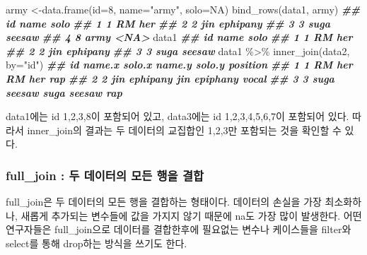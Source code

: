 \documentclass[
]{book}
\newenvironment{Shaded}{\begin{snugshade}}{\end{snugshade}}
\newcommand{\AttributeTok}[1]{\textcolor[rgb]{0.77,0.63,0.00}{#1}}
\newcommand{\ConstantTok}[1]{\textcolor[rgb]{0.00,0.00,0.00}{#1}}
\newcommand{\DecValTok}[1]{\textcolor[rgb]{0.00,0.00,0.81}{#1}}
\newcommand{\DocumentationTok}[1]{\textcolor[rgb]{0.56,0.35,0.01}{\textbf{\textit{#1}}}}
\newcommand{\FunctionTok}[1]{\textcolor[rgb]{0.00,0.00,0.00}{#1}}
\newcommand{\NormalTok}[1]{#1}
\newcommand{\OtherTok}[1]{\textcolor[rgb]{0.56,0.35,0.01}{#1}}
\newcommand{\SpecialCharTok}[1]{\textcolor[rgb]{0.00,0.00,0.00}{#1}}
\newcommand{\StringTok}[1]{\textcolor[rgb]{0.31,0.60,0.02}{#1}}
\theoremstyle{definition}
\theoremstyle{definition}
\theoremstyle{definition}
\theoremstyle{definition}
\theoremstyle{remark}
\begin{document}
\begin{Shaded}
\begin{Highlighting}[]
\NormalTok{army }\OtherTok{\textless{}{-}}\FunctionTok{data.frame}\NormalTok{(}\AttributeTok{id=}\DecValTok{8}\NormalTok{, }\AttributeTok{name=}\StringTok{"army"}\NormalTok{, }\AttributeTok{solo=}\ConstantTok{NA}\NormalTok{)}
\FunctionTok{bind\_rows}\NormalTok{(data1, army)}
\DocumentationTok{\#\#   id name     solo}
\DocumentationTok{\#\# 1  1   RM      her}
\DocumentationTok{\#\# 2  2  jin ephipany}
\DocumentationTok{\#\# 3  3 suga   seesaw}
\DocumentationTok{\#\# 4  8 army     \textless{}NA\textgreater{}}
\NormalTok{data1}
\DocumentationTok{\#\#   id name     solo}
\DocumentationTok{\#\# 1  1   RM      her}
\DocumentationTok{\#\# 2  2  jin ephipany}
\DocumentationTok{\#\# 3  3 suga   seesaw}
\NormalTok{data1 }\SpecialCharTok{\%\textgreater{}\%} 
  \FunctionTok{inner\_join}\NormalTok{(data2, }\AttributeTok{by=}\StringTok{"id"}\NormalTok{)}
\DocumentationTok{\#\#   id name.x   solo.x name.y   solo.y position}
\DocumentationTok{\#\# 1  1     RM      her     RM      her      rap}
\DocumentationTok{\#\# 2  2    jin ephipany    jin epiphany    vocal}
\DocumentationTok{\#\# 3  3   suga   seesaw   suga   seesaw      rap}
\end{Highlighting}
\end{Shaded}

data1에는 id 1,2,3,8이 포함되어 있고, data3에는 id 1,2,3,4,5,6,7이 포함되어 있다. 따라서 inner\_join의 결과는 두 데이터의 교집합인 1,2,3만 포함되는 것을 확인할 수 있다.

\hypertarget{full_join-uxb450-uxb370uxc774uxd130uxc758-uxbaa8uxb4e0-uxd589uxc744-uxacb0uxd569}{%
\subsubsection{full\_join : 두 데이터의 모든 행을 결합}\label{full_join-uxb450-uxb370uxc774uxd130uxc758-uxbaa8uxb4e0-uxd589uxc744-uxacb0uxd569}}

full\_join은 두 데이터의 모든 행을 결합하는 형태이다. 데이터의 손실을 가장 최소화하나, 새롭게 추가되는 변수들에 값을 가지지 않기 때문에 na도 가장 많이 발생한다. 어떤 연구자들은 full\_join으로 데이터를 결합한후에 필요없는 변수나 케이스들을 filter와 select를 통해 drop하는 방식을 쓰기도 한다.
\end{document}
